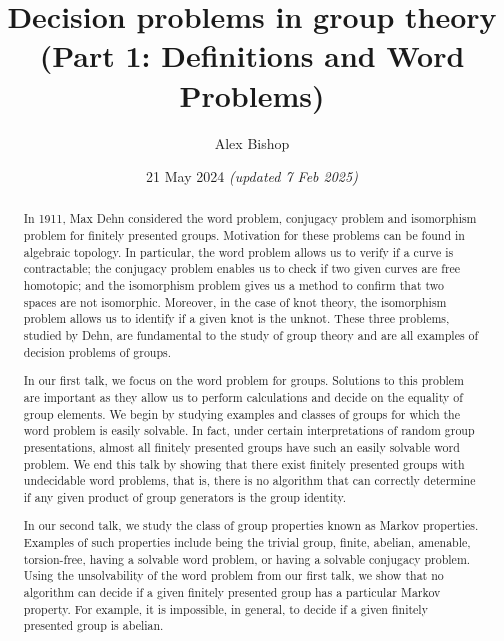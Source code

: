 \documentclass[11pt,a4paper,reqno]{amsart}
\theoremstyle{plain}
\theoremstyle{definition}
\theoremstyle{definition}
\begin{document}
\title{Decision problems in group theory\\(Part 1: Definitions and Word Problems)}
\author{Alex Bishop}
\date{21 May 2024 \textit{(updated 7 Feb 2025)}}
\address{%
	Section de mathématiques\\
	Université de Genève\\
	rue du Conseil-Général~7-9\\
	1205 Genève, Switzerland}

\begin{abstract}
	In 1911, Max Dehn considered the word problem, conjugacy problem and isomorphism problem for finitely presented groups. Motivation for these problems can be found in algebraic topology. In particular, the word problem allows us to verify if a curve is contractable; the conjugacy problem enables us to check if two given curves are free homotopic; and the isomorphism problem gives us a method to confirm that two spaces are not isomorphic. Moreover, in the case of knot theory, the isomorphism problem allows us to identify if a given knot is the unknot. These three problems, studied by Dehn, are fundamental to the study of group theory and are all examples of decision problems of groups.

	In our first talk, we focus on the word problem for groups. Solutions to this problem are important as they allow us to perform calculations and decide on the equality of group elements. We begin by studying examples and classes of groups for which the word problem is easily solvable. In fact, under certain interpretations of random group presentations, almost all finitely presented groups have such an easily solvable word problem. We end this talk by showing that there exist finitely presented groups with undecidable word problems, that is, there is no algorithm that can correctly determine if any given product of group generators is the group identity.

	In our second talk, we study the class of group properties known as Markov properties. Examples of such properties include being the trivial group, finite, abelian, amenable, torsion-free, having a solvable word problem, or having a solvable conjugacy problem. Using the unsolvability of the word problem from our first talk, we show that no algorithm can decide if a given finitely presented group has a particular Markov property. For example, it is impossible, in general, to decide if a given finitely presented group is abelian.
\end{abstract}
\maketitle
\end{document}

